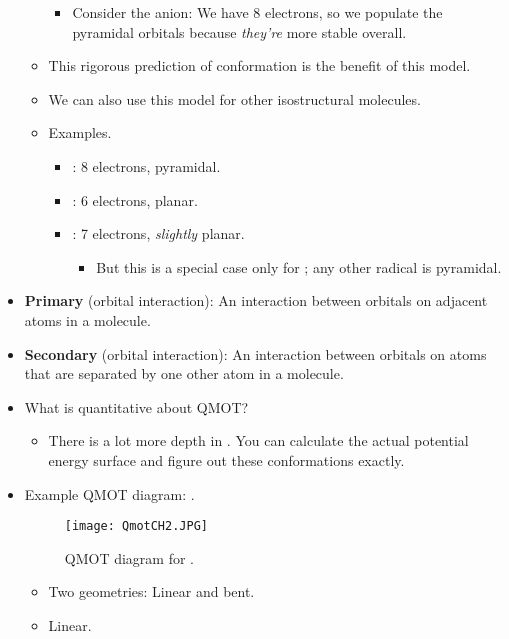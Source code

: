 \documentclass[../notes.tex]{subfiles}
\begin{document}
\begin{itemize}
\begin{itemize}
\begin{itemize}
            \item Consider the  anion: We have 8 electrons, so we populate the pyramidal orbitals because \emph{they're} more stable overall.
        \end{itemize}
        \item This rigorous prediction of conformation is the benefit of this model.
        \item We can also use this model for other isostructural molecules.
        \pagebreak
        \item Examples.
        \begin{itemize}
            \item {}: 8 electrons, pyramidal.
            \item {}: 6 electrons, planar.
            \item {}: 7 electrons, \emph{slightly} planar.
            \begin{itemize}
                \item But this is a special case only for ; any other radical is pyramidal.
            \end{itemize}
        \end{itemize}
    \end{itemize}
    \item \textbf{Primary} (orbital interaction): An interaction between orbitals on adjacent atoms in a molecule.
    \item \textbf{Secondary} (orbital interaction): An interaction between orbitals on atoms that are separated by one other atom in a molecule.
    \item What is quantitative about QMOT?
    \begin{itemize}
        \item There is a lot more depth in \textcite{bib:Anslyn}. You can calculate the actual potential energy surface and figure out these conformations exactly.
    \end{itemize}
    \item Example QMOT diagram: .
    \begin{figure}[h!]
        \centering
        \texttt{[image: QmotCH2.JPG]}
        \caption{QMOT diagram for .}
        \label{fig:QmotCH2}
    \end{figure}
    \begin{itemize}
        \item Two geometries: Linear and bent.
        \item Linear.

\end{itemize}
\end{itemize}
\end{document}
